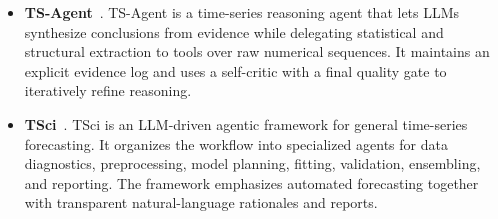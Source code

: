 \begin{itemize}
    \item \textbf{TS-Agent}~\citep{DBLP:journals/corr/abs-2510-07432}.
    TS-Agent is a time-series reasoning agent that lets LLMs synthesize conclusions from evidence while delegating statistical and structural extraction to tools over raw numerical sequences. It maintains an explicit evidence log and uses a self-critic with a final quality gate to iteratively refine reasoning.

    \item \textbf{TSci}~\citep{DBLP:journals/corr/abs-2510-01538}.
    TSci is an LLM-driven agentic framework for general time-series forecasting. It organizes the workflow into specialized agents for data diagnostics, preprocessing, model planning, fitting, validation, ensembling, and reporting. The framework emphasizes automated forecasting together with transparent natural-language rationales and reports.
\end{itemize}